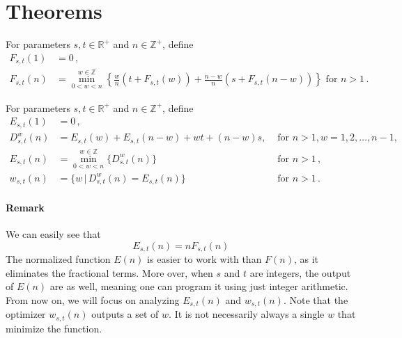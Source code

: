 \documentclass[]{article}
\begin{document}
\section{Theorems}

\vspace{1cm}
\begin{definition}
For parameters $s, t\in\mathbb{R}^+$ and $n \in\mathbb{Z}^+$, define
\begin{align*}
	F_{s,t}(1) &= 0\,,\\
	F_{s,t}(n) &= \min_{0<w<n}^{w\in\mathbb{Z}}\left\{\frac{w}{n}(t + F_{s,t}(w)) + \frac{n-w}{n}(s + F_{s,t}(n-w))\right\} \textrm{ for } n > 1 \,.
\end{align*}
\end{definition}

\vspace{1cm}
\begin{definition}
	For parameters $s, t\in\mathbb{R}^+$ and $n \in\mathbb{Z}^+$, define
	\begin{align*}
		E_{s,t}(1) &= 0\,,\\
		D^{w}_{s,t}(n) &= E_{s,t}(w) + E_{s,t}(n-w) + wt +(n-w)s,&\textrm{ for } n > 1, w=1,2,\dots,n-1, \\
		E_{s,t}(n) &= \min_{0<w<n}^{w\in\mathbb{Z}}\{D^{w}_{s,t}(n)\} &\textrm{ for } n > 1 \,,\\
		w_{s,t}(n) &= \{w \,|\, D^{w}_{s,t}(n) = E_{s,t}(n)\}\ &\textrm{ for } n > 1\,.
	\end{align*}
\end{definition}
\paragraph{Remark}
We can easily see that
\[
E_{s,t}(n) = nF_{s,t}(n)
\]
The normalized function $E(n)$ is easier to work with than $F(n)$, as it eliminates the fractional terms. More over, when $s$ and $t$ are integers, the output of $E(n)$ are as well, meaning one can program it using just integer arithmetic. From now on, we will focus on analyzing $E_{s,t}(n)$ and $w_{s,t}(n)$. Note that the optimizer $w_{s,t}(n)$ outputs a set of $w$. It is not necessarily always a single $w$ that minimize the function.
\end{document}
